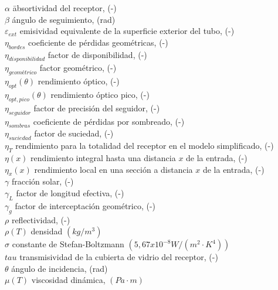 \begin{tabbing}
$\alpha$ \quad\quad\quad\quad\quad\quad\= absortividad del receptor, (-) \\
$\beta$ \> ángulo de seguimiento, (rad) \\
$\varepsilon_{ext}$ \> emisividad equivalente de la superficie exterior del tubo, (-) \\
$\eta_{bordes}$ \> coeficiente de pérdidas geométricas, (-)  \\
$\eta_{disponibilidad}$ \> factor de disponibilidad, (-) \\
$\eta_{geométrico}$ \> factor geométrico, (-) \\
$\eta_{opt}(\theta)$  \> rendimiento óptico, (-)  \\
$\eta_{opt,pico}(\theta)$  \> rendimiento óptico pico, (-)  \\
$\eta_{seguidor}$ \> factor de precisión del seguidor, (-) \\
$\eta_{sombras}$ \> coeficiente de pérdidas por sombreado, (-)  \\
$\eta_{suciedad}$ \> factor de suciedad, (-) \\
$\eta_{T}$ \> rendimiento para la totalidad del receptor en el modelo simplificado, (-)  \\
$\eta(x)$ \> rendimiento integral hasta una distancia $x$ de la entrada, (-)  \\
$\eta_x(x)$ \> rendimiento local en una sección a distancia $x$ de la entrada, (-) \\
$\gamma$ \> fracción solar, (-) \\
$\gamma_L$ \>  factor de longitud efectiva, (-)  \\
$\gamma_g$  \> factor de interceptación geométrico, (-)  \\
$\rho$ \> reflectividad, (-) \\
$\rho(T)$ \> densidad $(kg/m^3)$ \\
$\sigma$ \> constante de Stefan-Boltzmann $(5,67x10^{-8} W/(m^2 \cdot K^4))$\\
$tau$ \> transmisividad de la cubierta de vidrio del receptor, (-) \\
$\theta$ \> ángulo de incidencia, (rad) \\
$\mu(T)$ \> viscosidad dinámica, $(Pa \cdot m)$ 
\end{tabbing}

